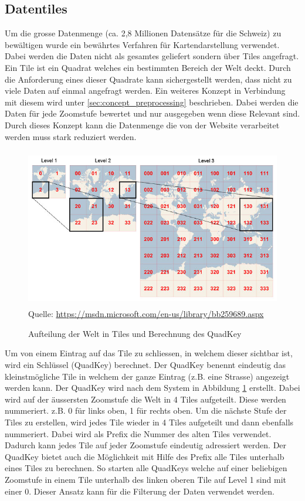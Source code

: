\subsection{Datentiles}
Um die grosse Datenmenge (ca. 2,8 Millionen Datensätze für die Schweiz) zu bewältigen wurde ein bewährtes Verfahren für Kartendarstellung verwendet. Dabei werden die Daten nicht als gesamtes geliefert sondern über Tiles angefragt. Ein Tile ist ein Quadrat welches ein bestimmten Bereich der Welt deckt. Durch die Anforderung eines dieser Quadrate kann sichergestellt werden, dass nicht zu viele Daten auf einmal angefragt werden. Ein weiteres Konzept in Verbindung mit diesem wird unter \ref{sec:concept_preprocessing}  beschrieben. Dabei werden die Daten für jede Zoomstufe bewertet und nur ausgegeben wenn diese Relevant sind. Durch dieses Konzept kann die Datenmenge die von der Website verarbeitet werden muss stark reduziert werden.
\begin{figure}[H]
\centering
\includegraphics[height=7cm]{images/BingMapsTileSystem.jpg}
Quelle: \href{https://msdn.microsoft.com/en-us/library/bb259689.aspx}{https://msdn.microsoft.com/en-us/library/bb259689.aspx}
\caption{Aufteilung der Welt in Tiles und Berechnung des QuadKey}
\label{fig:tilesystem}
\end{figure}
Um von einem Eintrag auf das Tile zu schliessen, in welchem dieser sichtbar ist, wird ein Schlüssel (QuadKey) berechnet. Der QuadKey benennt eindeutig das kleinstmögliche Tile in welchem der ganze Eintrag (z.B. eine Strasse) angezeigt werden kann. Der QuadKey wird nach dem System in Abbildung \ref{fig:tilesystem} erstellt. Dabei wird auf der äussersten Zoomstufe die Welt in 4 Tiles aufgeteilt. Diese werden nummeriert. z.B. 0 für links oben, 1 für rechts oben. Um die nächste Stufe der Tiles zu erstellen, wird jedes Tile wieder in 4 Tiles aufgeteilt und dann ebenfalls nummeriert. Dabei wird als Prefix die Nummer des alten Tiles verwendet. Dadurch kann jedes Tile auf jeder Zoomstufe eindeutig adressiert werden. Der QuadKey bietet auch die Möglichkeit mit Hilfe des Prefix alle Tiles unterhalb eines Tiles zu berechnen. So starten alle QuadKeys welche auf einer beliebigen Zoomstufe in einem Tile unterhalb des linken oberen Tile auf Level 1 sind mit einer 0. Dieser Ansatz kann für die Filterung der Daten verwendet werden.
